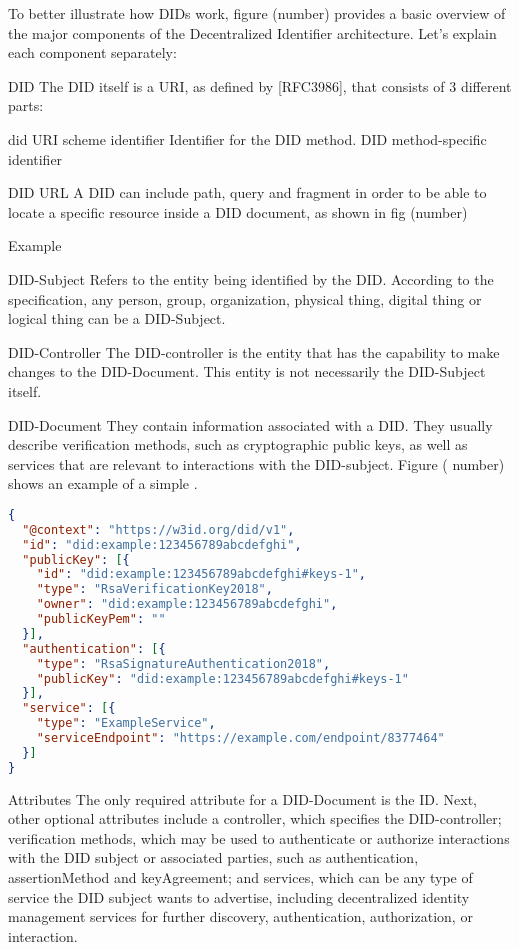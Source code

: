 To better illustrate how DIDs work, figure (number) provides a basic overview of the major components of the Decentralized Identifier architecture. Let's explain each component separately: 

DID
The DID itself is a URI, as defined by [RFC3986], that consists of 3 different parts:

 did URI scheme identifier
 Identifier for the DID method. 
 DID method-specific identifier



DID URL
A DID can include path, query and fragment in order to be able to locate a specific resource inside a DID document, as shown in fig (number)

Example

DID-Subject
Refers to the entity being identified by the DID. According to the specification, any person, group, organization, physical thing, digital thing or logical thing can be a DID-Subject.

DID-Controller
The DID-controller is the entity that has the capability to make changes to the DID-Document. This entity is not necessarily the DID-Subject itself.

DID-Document
They contain information associated with a DID. They usually describe verification methods, such as cryptographic public keys, as well as services that are relevant to interactions with the DID-subject. Figure ( number) shows an example of a simple \label{did-document}. 

\begin{lstlisting}[language=json, caption=Example DID-Document, label=did-document]
{
  "@context": "https://w3id.org/did/v1",
  "id": "did:example:123456789abcdefghi",
  "publicKey": [{
    "id": "did:example:123456789abcdefghi#keys-1",
    "type": "RsaVerificationKey2018",
    "owner": "did:example:123456789abcdefghi",
    "publicKeyPem": ""
  }],
  "authentication": [{
    "type": "RsaSignatureAuthentication2018",
    "publicKey": "did:example:123456789abcdefghi#keys-1"
  }],
  "service": [{
    "type": "ExampleService",
    "serviceEndpoint": "https://example.com/endpoint/8377464"
  }]
}

\end{lstlisting}

Attributes
The only required attribute for a DID-Document is the ID. Next, other optional attributes include a controller, which specifies the DID-controller; verification methods, which may be used to authenticate or authorize interactions with the DID subject or associated parties, such as authentication, assertionMethod and keyAgreement; and services, which can be any type of service the DID subject wants to advertise, including decentralized identity management services for further discovery, authentication, authorization, or interaction.
 

